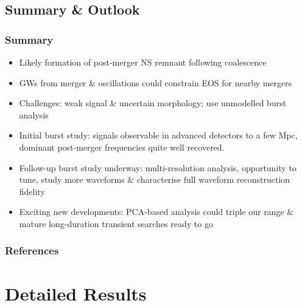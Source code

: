 \documentclass[serif,mathserif,10pt]{beamer}
\let\oldframetitle\frametitle%
\renewcommand{\frametitle}[1]{%
      \oldframetitle{#1}\setstretch{1.2}}
\begin{document}
\subsection{Summary \& Outlook}
\begin{frame}
    \frametitle{Summary}
    \begin{itemize}
        \item Likely formation of post-merger NS remnant following coalescence
        \item GWs from merger \& oscillations could constrain EOS for nearby
            mergers
        \item Challenges: weak signal \& uncertain morphology; use unmodelled
            burst analysis
        \item Initial burst study: signals observable in advanced detectors to a few
            Mpc, dominant post-merger frequencies quite well recovered.
        \item Follow-up burst study underway: multi-resolution analysis,
            opportunity to tune, study more waveforms \& characterise full
            waveform reconstruction fidelity
        \item Exciting new developments: PCA-based analysis could triple our
            range \& mature long-duration transient searches ready to go
    \end{itemize}
\end{frame}

\begin{frame}[allowframebreaks]
    \frametitle{References}
    
    \tiny{
        
}
\end{frame}

\appendix

\section{Detailed Results}
\end{document}
